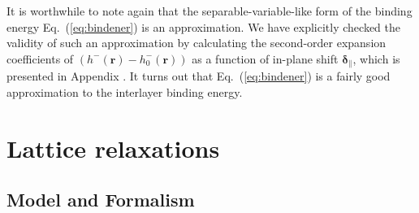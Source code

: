 \documentclass[aps,prx,10pt,twocolumn,superscriptaddress]{revtex4}
\def\I{\uppercase\expandafter{\romannumeral 1}}
\begin{document}
 It is worthwhile to note again that the separable-variable-like form of the binding energy Eq.~(\ref{eq:bindener}) is an approximation. We have explicitly checked the validity of such an approximation by  calculating the second-order expansion coefficients of $(h^{-}(\mathbf{r})-h^{-}_0(\mathbf{r}))$ as a function of in-plane shift $\bm{\delta}_{\parallel}$, which is presented in Appendix \I. 
It turns out that Eq.~(\ref{eq:bindener}) is a fairly good approximation to the interlayer binding energy.



\section{Lattice relaxations}

\subsection{Model and Formalism}
\label{sec:lattice}
\end{document}
